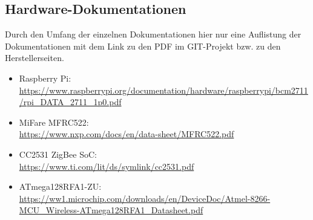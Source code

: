\subsection{Hardware-Dokumentationen}\label{hardwaredoku}
Durch den Umfang der einzelnen Dokumentationen hier nur eine Auflistung der Dokumentationen mit dem Link zu den PDF im GIT-Projekt bzw. zu den Herstellerseiten.
\begin{itemize}
 	\item Raspberry Pi:\\ {\url{https://www.raspberrypi.org/documentation/hardware/raspberrypi/bcm2711/rpi_DATA_2711_1p0.pdf}}
 	\item MiFare MFRC522:\\ {\url{https://www.nxp.com/docs/en/data-sheet/MFRC522.pdf}}
 	\item CC2531 ZigBee SoC:\\ {\url{https://www.ti.com/lit/ds/symlink/cc2531.pdf}}
 	\item ATmega128RFA1-ZU:\\ {\url{https://ww1.microchip.com/downloads/en/DeviceDoc/Atmel-8266-MCU_Wireless-ATmega128RFA1_Datasheet.pdf}}
\end{itemize}
\newpage